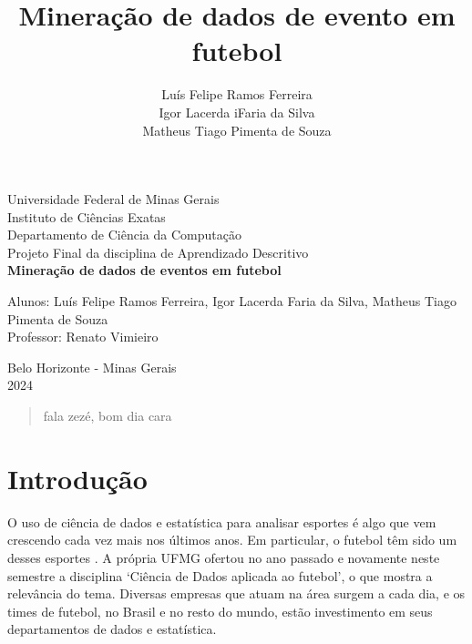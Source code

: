 \documentclass{article}
\begin{document}
\begin{titlepage}
	\begin{center}
		{\large Universidade Federal de Minas Gerais}\\[0.2cm]
		{\large Instituto de Ciências Exatas}\\[0.2cm]
		{\large Departamento de Ciência da Computação}\\[0.2cm]
		{\large Projeto Final da disciplina de Aprendizado
		Descritivo}\\[5.1cm]
		{\large \bf Mineração de dados de eventos em futebol}\\[5.1cm]
	\end{center}
	{\large Alunos: Luís Felipe Ramos Ferreira, Igor Lacerda Faria da
	Silva,
	Matheus Tiago Pimenta de Souza}\\[0.7cm]
	{\large Professor: Renato Vimieiro}\\[5.1cm]
	\begin{center}
		{\large Belo Horizonte - Minas Gerais}\\[0.2cm]
		{\large 2024}
	\end{center}
\end{titlepage}

\newpage
\begin{quote}
	fala zezé, bom dia cara
\end{quote}

\newpage
\renewcommand{\contentsname}{Sumário}
\tableofcontents
\newpage

\title{Mineração de dados de evento em futebol}
\author{Luís Felipe Ramos Ferreira \\  Igor Lacerda iFaria da Silva \\ Matheus
	Tiago Pimenta de Souza}

\maketitle

\section{Introdução}

O uso de ciência de dados e estatística para analisar esportes é algo que vem
crescendo cada vez mais nos últimos anos. Em
particular, o futebol têm sido um desses
esportes \cite{takvorian2021beautiful}. A própria UFMG ofertou no
ano passado e novamente neste semestre a disciplina `Ciência de Dados aplicada
ao futebol', o que mostra a relevância do tema. Diversas empresas que atuam na
área surgem a cada dia, e os times de futebol, no Brasil e no resto do
mundo, estão investimento em seus departamentos de dados e estatística.
\end{document}
